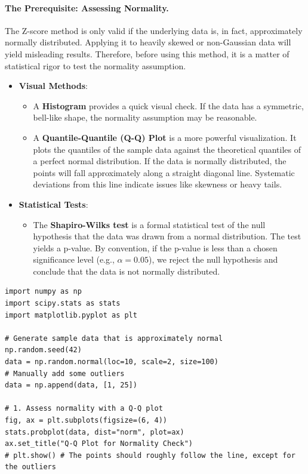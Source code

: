 \begin{itemize}
\paragraph{The Prerequisite: Assessing Normality.} The Z-score method is only valid if the underlying data is, in fact, approximately normally distributed. Applying it to heavily skewed or non-Gaussian data will yield misleading results. Therefore, before using this method, it is a matter of statistical rigor to test the normality assumption.
\begin{itemize}
    \item \textbf{Visual Methods}:
    \begin{itemize}
        \item A \textbf{Histogram} provides a quick visual check. If the data has a symmetric, bell-like shape, the normality assumption may be reasonable.
        \item A \textbf{Quantile-Quantile (Q-Q) Plot} is a more powerful visualization. It plots the quantiles of the sample data against the theoretical quantiles of a perfect normal distribution. If the data is normally distributed, the points will fall approximately along a straight diagonal line. Systematic deviations from this line indicate issues like skewness or heavy tails.
    \end{itemize}
    \item \textbf{Statistical Tests}:
    \begin{itemize}
        \item The \textbf{Shapiro-Wilks test} is a formal statistical test of the null hypothesis that the data was drawn from a normal distribution. The test yields a p-value. By convention, if the p-value is less than a chosen significance level (e.g., $\alpha = 0.05$), we reject the null hypothesis and conclude that the data is not normally distributed.
    \end{itemize}
\end{itemize}

\begin{verbatim}
import numpy as np
import scipy.stats as stats
import matplotlib.pyplot as plt

# Generate sample data that is approximately normal
np.random.seed(42)
data = np.random.normal(loc=10, scale=2, size=100)
# Manually add some outliers
data = np.append(data, [1, 25])

# 1. Assess normality with a Q-Q plot
fig, ax = plt.subplots(figsize=(6, 4))
stats.probplot(data, dist="norm", plot=ax)
ax.set_title("Q-Q Plot for Normality Check")
# plt.show() # The points should roughly follow the line, except for the outliers


\end{verbatim}
\end{itemize}
